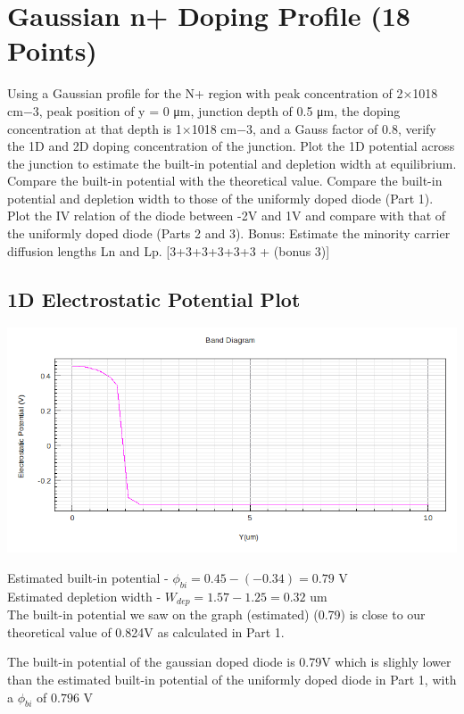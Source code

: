 \documentclass[12pt]{article}
\begin{document}
\section{Gaussian n+ Doping Profile (18 Points)}
Using a Gaussian profile for the N+ region with peak concentration of 2×1018 cm−3, peak position of y = 0 μm, junction depth of 0.5 μm, the doping concentration at that depth is 1×1018 cm−3, and a Gauss factor of 0.8, verify the 1D and 2D doping concentration of the junction. Plot the 1D potential across the junction to estimate the built-in potential and depletion width at equilibrium. Compare the built-in potential with the theoretical value. Compare the built-in potential and depletion width to those of the uniformly doped diode (Part 1). Plot the IV relation of the diode between -2V and 1V and compare with that of the uniformly doped diode (Parts 2 and 3). Bonus: Estimate the minority carrier diffusion lengths Ln and Lp. [3+3+3+3+3+3 + (bonus 3)]

\subsection{1D Electrostatic Potential Plot}
\includegraphics[width=\textwidth]{5a.png}

Estimated built-in potential - $\phi_{bi}  = 0.45 - (-0.34) = 0.79$ V\\

Estimated depletion width - $W_{dep} = 1.57 - 1.25 = 0.32$ um\\

The built-in potential we saw on the graph (estimated) (0.79) is close to our theoretical value of 0.824V as calculated in Part 1.

The built-in potential of the gaussian doped diode is 0.79V which is slighly lower than the estimated built-in potential of the uniformly doped diode in Part 1, with a $\phi_{bi}$ of $0.796$ V\\
\end{document}
